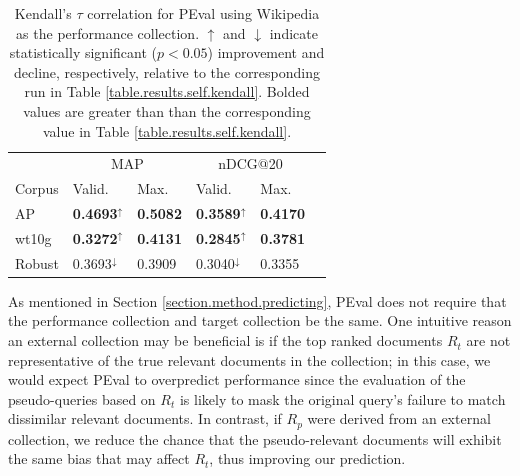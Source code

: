 \documentclass{sig-alternate}
\begin{document}
\begin{table}
\centering
\begin{tabular}{|l|l|l|l|l|l|} \hline
& \multicolumn{2}{c|}{MAP} & \multicolumn{2}{c|}{nDCG@20} \\ \cline{2-5}
Corpus & Valid. & Max. & Valid. & Max. \\ \hline\hline
AP & \textbf{0.4693}$^{\uparrow}$ & \textbf{0.5082} & \textbf{0.3589}$^{\uparrow}$ & \textbf{0.4170} \\ \hline
wt10g & \textbf{0.3272}$^{\uparrow}$ & \textbf{0.4131} & \textbf{0.2845}$^{\uparrow}$ & \textbf{0.3781} \\ \hline
Robust & 0.3693$^{\downarrow}$ & 0.3909 & 0.3040$^{\downarrow}$ & 0.3355 \\ \hline
\end{tabular}
\caption{Kendall's $\tau$ correlation for PEval using Wikipedia as the performance collection. $\uparrow$ and $\downarrow$ indicate statistically significant ($p < 0.05$) improvement and decline, respectively, relative to the corresponding run in Table \ref{table.results.self.kendall}. Bolded values are greater than than the corresponding value in Table \ref{table.results.self.kendall}.}
\label{table.results.wiki.kendall}
\end{table}

As mentioned in Section \ref{section.method.predicting}, PEval does not require that the performance collection and target collection be the same. One intuitive reason an external collection may be beneficial is if the top ranked documents $R_t$ are not representative of the true relevant documents in the collection; in this case, we would expect PEval to overpredict performance since the evaluation of the pseudo-queries based on $R_t$ is likely to mask the original query's failure to match dissimilar relevant documents. In contrast, if $R_p$ were derived from an external collection, we reduce the chance that the pseudo-relevant documents will exhibit the same bias that may affect $R_t$, thus improving our prediction.

\end{document}
